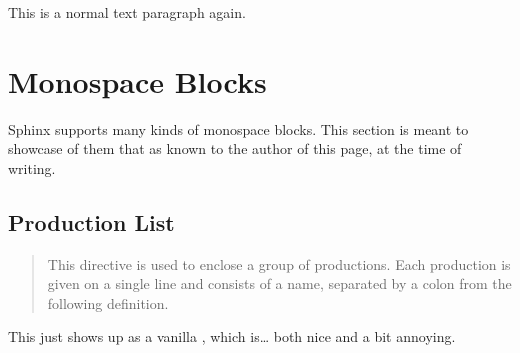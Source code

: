 \documentclass[a4paper,10pt,english]{sphinxmanual}
\begin{document}
\sphinxAtStartPar
This is a normal text paragraph again.


\section{Monospace Blocks}
\label{\detokenize{test1:monospace-blocks}}
\sphinxAtStartPar
Sphinx supports many kinds of monospace blocks. This section is meant to
showcase  of them that as known to the author of this page, at the time of
writing.


\subsection{Production List}
\label{\detokenize{test1:production-list}}
\sphinxAtStartPar
{}
\begin{quote}

\sphinxAtStartPar
This directive is used to enclose a group of productions. Each production is given on a single line and consists of a name, separated by a colon from the following definition.
\end{quote}

\sphinxAtStartPar
This just shows up as a vanilla , which is… both nice and a bit
annoying.


\begin{productionlist}
\label{\detokenize{test1:grammar-token-try_stmt}}
\label{\detokenize{test1:grammar-token-try1_stmt}}
\label{\detokenize{test1:grammar-token-try2_stmt}}
\end{productionlist}
\end{document}

